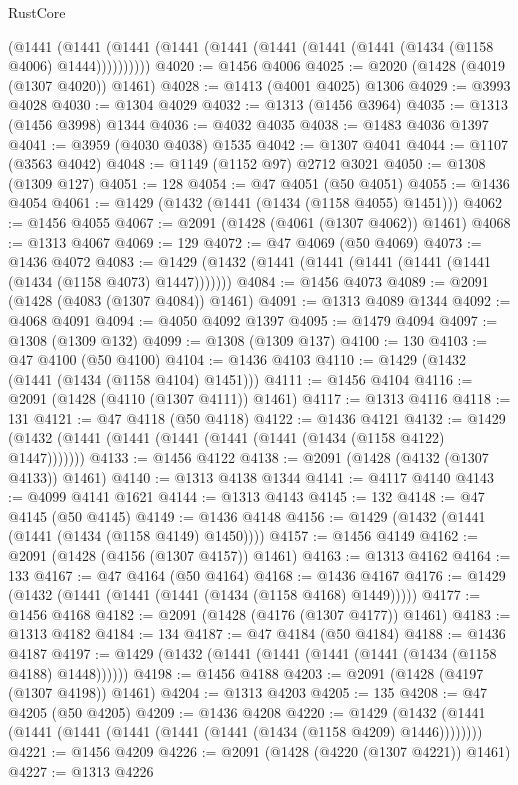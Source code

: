 \begin{lexlean}{RustCore}
\begin{coremodule}
      (@1441 (@1441 (@1441 (@1441 (@1441 (@1441 (@1441 (@1441 (@1434 (@1158 @4006) @1444))))))))))
@4020 := @1456 @4006
@4025 := @2020 (@1428 (@4019 (@1307 @4020)) @1461)
@4028 := @1413 (@4001 @4025) @1306
@4029 := @3993 @4028
@4030 := @1304 @4029
@4032 := @1313 (@1456 @3964)
@4035 := @1313 (@1456 @3998) @1344
@4036 := @4032 @4035
@4038 := @1483 @4036 @1397
@4041 := @3959 (@4030 @4038) @1535
@4042 := @1307 @4041
@4044 := @1107 (@3563 @4042)
@4048 := @1149 (@1152 @97) @2712 @3021
@4050 := @1308 (@1309 @127)
@4051 := 128
@4054 := @47 @4051 (@50 @4051)
@4055 := @1436 @4054
@4061 := @1429 (@1432 (@1441 (@1434 (@1158 @4055) @1451)))
@4062 := @1456 @4055
@4067 := @2091 (@1428 (@4061 (@1307 @4062)) @1461)
@4068 := @1313 @4067
@4069 := 129
@4072 := @47 @4069 (@50 @4069)
@4073 := @1436 @4072
@4083 := @1429 (@1432 (@1441 (@1441 (@1441 (@1441 (@1441 (@1434 (@1158 @4073) @1447)))))))
@4084 := @1456 @4073
@4089 := @2091 (@1428 (@4083 (@1307 @4084)) @1461)
@4091 := @1313 @4089 @1344
@4092 := @4068 @4091
@4094 := @4050 @4092 @1397
@4095 := @1479 @4094
@4097 := @1308 (@1309 @132)
@4099 := @1308 (@1309 @137)
@4100 := 130
@4103 := @47 @4100 (@50 @4100)
@4104 := @1436 @4103
@4110 := @1429 (@1432 (@1441 (@1434 (@1158 @4104) @1451)))
@4111 := @1456 @4104
@4116 := @2091 (@1428 (@4110 (@1307 @4111)) @1461)
@4117 := @1313 @4116
@4118 := 131
@4121 := @47 @4118 (@50 @4118)
@4122 := @1436 @4121
@4132 := @1429 (@1432 (@1441 (@1441 (@1441 (@1441 (@1441 (@1434 (@1158 @4122) @1447)))))))
@4133 := @1456 @4122
@4138 := @2091 (@1428 (@4132 (@1307 @4133)) @1461)
@4140 := @1313 @4138 @1344
@4141 := @4117 @4140
@4143 := @4099 @4141 @1621
@4144 := @1313 @4143
@4145 := 132
@4148 := @47 @4145 (@50 @4145)
@4149 := @1436 @4148
@4156 := @1429 (@1432 (@1441 (@1441 (@1434 (@1158 @4149) @1450))))
@4157 := @1456 @4149
@4162 := @2091 (@1428 (@4156 (@1307 @4157)) @1461)
@4163 := @1313 @4162
@4164 := 133
@4167 := @47 @4164 (@50 @4164)
@4168 := @1436 @4167
@4176 := @1429 (@1432 (@1441 (@1441 (@1441 (@1434 (@1158 @4168) @1449)))))
@4177 := @1456 @4168
@4182 := @2091 (@1428 (@4176 (@1307 @4177)) @1461)
@4183 := @1313 @4182
@4184 := 134
@4187 := @47 @4184 (@50 @4184)
@4188 := @1436 @4187
@4197 := @1429 (@1432 (@1441 (@1441 (@1441 (@1441 (@1434 (@1158 @4188) @1448))))))
@4198 := @1456 @4188
@4203 := @2091 (@1428 (@4197 (@1307 @4198)) @1461)
@4204 := @1313 @4203
@4205 := 135
@4208 := @47 @4205 (@50 @4205)
@4209 := @1436 @4208
@4220 := @1429 (@1432 (@1441 (@1441 (@1441 (@1441 (@1441 (@1441 (@1434 (@1158 @4209) @1446))))))))
@4221 := @1456 @4209
@4226 := @2091 (@1428 (@4220 (@1307 @4221)) @1461)
@4227 := @1313 @4226

\end{coremodule}
\end{lexlean}

